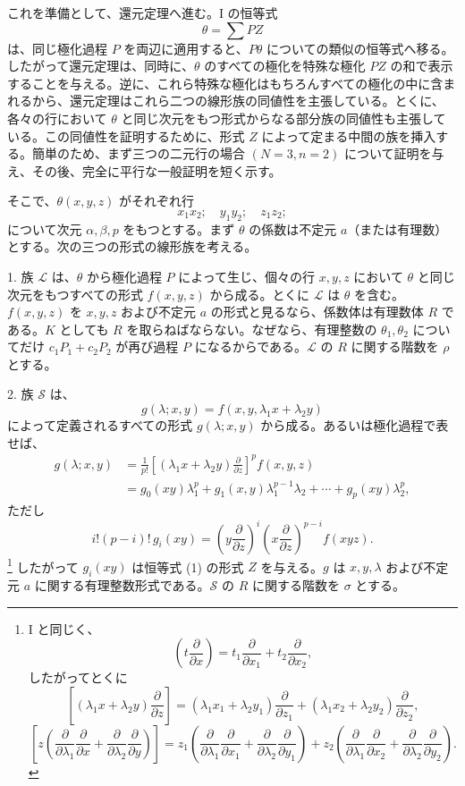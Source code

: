 \documentclass[11pt]{article}
\begin{document}
これを準備として、還元定理へ進む。I の恒等式
\[
  \theta=\sum PZ
\]
は、同じ極化過程 $P$ を両辺に適用すると、$P\theta$ についての類似の恒等式へ移る。したがって還元定理は、同時に、$\theta$ のすべての極化を特殊な極化 $PZ$ の和で表示することを与える。逆に、これら特殊な極化はもちろんすべての極化の中に含まれるから、還元定理はこれら二つの線形族の同値性を主張している。とくに、各々の行において $\theta$ と同じ次元をもつ形式からなる部分族の同値性も主張している。この同値性を証明するために、形式 $Z$ によって定まる中間の族を挿入する。簡単のため、まず三つの二元行の場合 $(N=3,n=2)$ について証明を与え、その後、完全に平行な一般証明を短く示す。

そこで、$\theta(x,y,z)$ がそれぞれ行
\[
  x_1x_2;\quad y_1y_2;\quad z_1z_2;
\]
について次元 $\alpha,\beta,p$ をもつとする。まず $\theta$ の係数は不定元 $a$（または有理数）とする。次の三つの形式の線形族を考える。

1. 族 $\mathcal L$ は、$\theta$ から極化過程 $P$ によって生じ、個々の行 $x,y,z$ において $\theta$ と同じ次元をもつすべての形式 $f(x,y,z)$ から成る。とくに $\mathcal L$ は $\theta$ を含む。$f(x,y,z)$ を $x,y,z$ および不定元 $a$ の形式と見るなら、係数体は有理数体 $R$ である。$K$ としても $R$ を取らねばならない。なぜなら、有理整数の $\theta_1,\theta_2$ についてだけ $c_1P_1+c_2P_2$ が再び過程 $P$ になるからである。$\mathcal L$ の $R$ に関する階数を $\rho$ とする。

2. 族 $\mathcal S$ は、
\[
  g(\lambda;x,y)=f(x,y,\lambda_1x+\lambda_2y)
\]
によって定義されるすべての形式 $g(\lambda;x,y)$ から成る。あるいは極化過程で表せば、
\[
\begin{aligned}
  g(\lambda;x,y)
  &=\frac1{p!}\left[(\lambda_1x+\lambda_2y)\frac{\partial}{\partial z}\right]^p f(x,y,z) \\
  &=g_0(xy)\lambda_1^p+g_1(x,y)\lambda_1^{p-1}\lambda_2+\cdots+g_p(xy)\lambda_2^p,
\end{aligned}
\]
ただし
\[
  i!(p-i)!\,g_i(xy)=
  \left(y\frac{\partial}{\partial z}\right)^i
  \left(x\frac{\partial}{\partial z}\right)^{p-i}f(xyz).
\]
\footnote{I と同じく、
\[
 \left(t\frac{\partial}{\partial x}\right)=t_1\frac{\partial}{\partial x_1}+t_2\frac{\partial}{\partial x_2},
\]
したがってとくに
\[
 \left[(\lambda_1x+\lambda_2y)\frac{\partial}{\partial z}\right]
 = (\lambda_1x_1+\lambda_2y_1)\frac{\partial}{\partial z_1}
 + (\lambda_1x_2+\lambda_2y_2)\frac{\partial}{\partial z_2},
\]
\[
 \left[z\left(\frac{\partial}{\partial\lambda_1}\frac{\partial}{\partial x}
 +\frac{\partial}{\partial\lambda_2}\frac{\partial}{\partial y}\right)\right]
 =z_1\left(\frac{\partial}{\partial\lambda_1}\frac{\partial}{\partial x_1}
 +\frac{\partial}{\partial\lambda_2}\frac{\partial}{\partial y_1}\right)
 +z_2\left(\frac{\partial}{\partial\lambda_1}\frac{\partial}{\partial x_2}
 +\frac{\partial}{\partial\lambda_2}\frac{\partial}{\partial y_2}\right).
\]}
したがって $g_i(xy)$ は恒等式 (1) の形式 $Z$ を与える。$g$ は $x,y,\lambda$ および不定元 $a$ に関する有理整数形式である。$\mathcal S$ の $R$ に関する階数を $\sigma$ とする。
\end{document}
